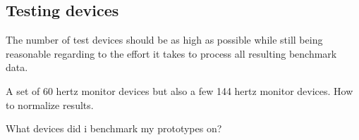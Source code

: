 \subsection{Testing devices}

The number of test devices should be as high as possible while still being reasonable regarding to the effort it takes to process all resulting benchmark data.

A set of 60 hertz monitor devices but also a few 144 hertz monitor devices. How to normalize results.

What devices did i benchmark my prototypes on?
